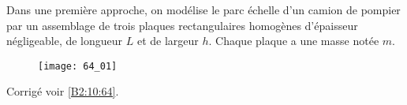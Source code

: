 \normaltrue \difficilefalse \tdifficilefalse
\correctionfalse


\setcounter{question}{0}
\ifcorrection
\else
{}
\fi



\ifprof
\else
Dans une première approche, on modélise le parc échelle d'un camion de pompier par un assemblage de trois plaques
rectangulaires homogènes d’épaisseur négligeable, de longueur $L$ et de largeur $h$. Chaque plaque a une masse notée $m$.


\begin{figure}[H]
\centering
\texttt{[image: 64\_01]}
\end{figure}
\fi

\ifprof
\else
\fi



\ifprof
\else
\begin{flushright}
\footnotesize{Corrigé voir \ref{B2:10:64}.}
\end{flushright}%
\fi